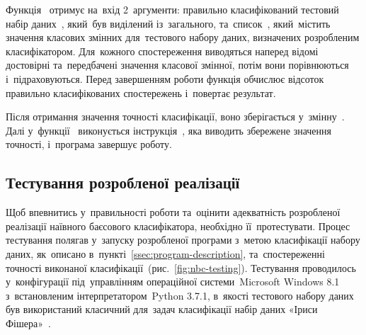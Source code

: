 \documentclass[
	a4paper,
	oneside,
	DIV = 12,
	fontsize = 13pt,
	headings = normal,
	numbers = endperiod,
	bibliography = totoc, %
]{scrartcl}
\theoremstyle{mythm}
\begin{document}
						Функція~ отримує на~вхід 2~аргументи: правильно класифікований тестовий набір даних~, який~був виділений із~загального, та~список~, який~містить значення класових змінних для~тестового набору даних, визначених розробленим класифікатором. Для~кожного спостереження виводяться наперед відомі достовірні та~передбачені значення класової змінної, потім вони порівнюються і~підраховуються. Перед завершенням роботи функція обчислює відсоток правильно класифікованих спостережень і~повертає результат. 

						Після отримання значення точності класифікації, воно зберігається у~змінну~. Далі у~функції~ виконується інструкція~, яка виводить збережене значення точності, і~програма завершує роботу.

				\subsection{Тестування розробленої реалізації}
					Щоб впевнитись у~правильності роботи та~оцінити адекватність розробленої реалізації наївного баєсового класифікатора, необхідно її~протестувати. Процес тестування полягав у~запуску розробленої програми з~метою класифікації набору даних, як~описано в~пункті~\ref{ssec:program-description}, та~спостереженні точності виконаної класифікації~(рис.~\ref{fig:nbc-testing}). Тестування проводилось у~конфігурації під~управлінням операційної системи~\textenglish{Microsoft Windows 8.1} з~встановленим інтерпретатором~\textenglish{Python 3.7.1}, в~якості тестового набору даних був використаний класичний для~задач класифікації набір даних «Іриси Фішера»~\cite{dataset-iris}.
\end{document}
